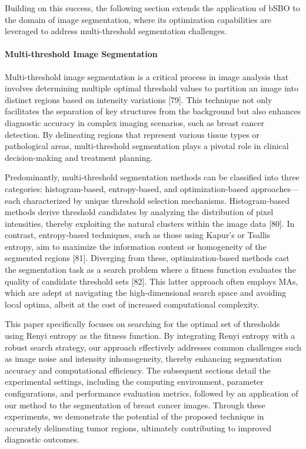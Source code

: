 \documentclass{article} %
\begin{document}
Building on this success, the following section extends the application of bSBO to the domain of image segmentation, where its optimization capabilities are leveraged to address multi-threshold segmentation challenges.


\paragraph{ Multi-threshold Image Segmentation}

Multi-threshold image segmentation is a critical process in image analysis that involves determining multiple optimal threshold values to partition an image into distinct regions based on intensity variations [79]. This technique not only facilitates the separation of key structures from the background but also enhances diagnostic accuracy in complex imaging scenarios, such as breast cancer detection. By delineating regions that represent various tissue types or pathological areas, multi-threshold segmentation plays a pivotal role in clinical decision-making and treatment planning.

Predominantly, multi-threshold segmentation methods can be classified into three categories: histogram-based, entropy-based, and optimization-based approaches---each characterized by unique threshold selection mechanisms. Histogram-based methods derive threshold candidates by analyzing the distribution of pixel intensities, thereby exploiting the natural clusters within the image data [80]. In contrast, entropy-based techniques, such as those using Kapur's or Tsallis entropy, aim to maximize the information content or homogeneity of the segmented regions [81]. Diverging from these, optimization-based methods cast the segmentation task as a search problem where a fitness function evaluates the quality of candidate threshold sets [82]. This latter approach often employs MAs, which are adept at navigating the high-dimensional search space and avoiding local optima, albeit at the cost of increased computational complexity.

This paper specifically focuses on searching for the optimal set of thresholds using Renyi entropy as the fitness function. By integrating Renyi entropy with a robust search strategy, our approach effectively addresses common challenges such as image noise and intensity inhomogeneity, thereby enhancing segmentation accuracy and computational efficiency. The subsequent sections detail the experimental settings, including the computing environment, parameter configurations, and performance evaluation metrics, followed by an application of our method to the segmentation of breast cancer images. Through these experiments, we demonstrate the potential of the proposed technique in accurately delineating tumor regions, ultimately contributing to improved diagnostic outcomes.
\end{document}

